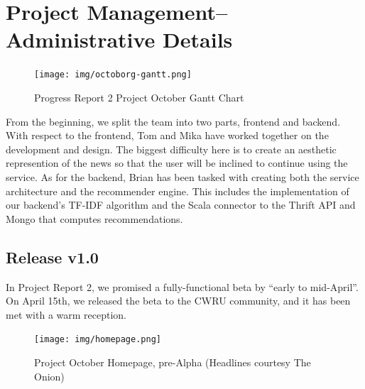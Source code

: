 \documentclass[11pt,letterpaper,titlepage]{article}
\begin{document}
\section{Project Management--Administrative Details}

\begin{figure}
\centering
\texttt{[image: img/octoborg-gantt.png]}
\caption{Progress Report 2 Project October Gantt Chart}
\label{fig:gantt}
\end{figure}

From the beginning, we split the team into two parts, frontend and backend.
With respect to the frontend, Tom and Mika have worked together on the development and design.
The biggest difficulty here is to create an aesthetic represention of the news so that the user will be inclined to continue using the service.
As for the backend, Brian has been tasked with creating both the service architecture and the recommender engine.
This includes the implementation of our backend's TF-IDF algorithm and the Scala connector to the Thrift API and Mongo that computes recommendations.

\subsection{Release v1.0}
\label{sec:release1.0}
In Project Report 2, we promised a fully-functional beta by ``early to mid-April''.
On April 15th, we released the beta to the CWRU community, and it has been met with a warm reception.

\begin{figure}
\centering
\texttt{[image: img/homepage.png]}
\caption{Project October Homepage, pre-Alpha (Headlines courtesy The Onion)}
\label{fig:homepage}
\end{figure}
\end{document}
